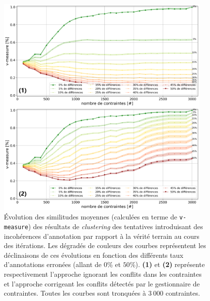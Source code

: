 			\begin{figure}[!htb]
				\centering
				\includegraphics[width=0.95\textwidth]{figures/etude-erreur-simulation-impact-closest}
				\caption{
					Évolution des similitudes moyennes (calculées en terme de \texttt{v-measure}) des résultats de \textit{clustering} des tentatives introduisant des incohérences d'annotation par rapport à la vérité terrain au cours des itérations.
					Les dégradés de couleurs des courbes représentent les déclinaisons de ces évolutions en fonction des différents taux d'annotations erronées (allant de $0$\% et $50$\%).
					\textbf{(1)} et \textbf{(2)} représente respectivement l'approche ignorant les conflits dans les contraintes et l'approche corrigeant les conflits détectés par le gestionnaire de contraintes.
					Toutes les courbes sont tronquées à $3~000$ contraintes.
				}
				\label{figure:4.6.1-ETUDE-ROBUSTESSE-INTERETS-CORRECTION-INCOHERENCES}
			\end{figure}
			
